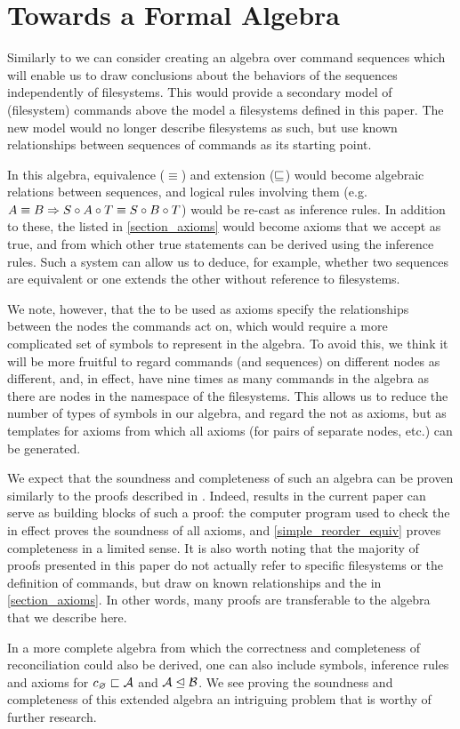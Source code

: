 
\section{Towards a Formal Algebra}

Similarly to \cite{NREC} we can consider creating an algebra over command sequences
which will enable us to draw conclusions about the behaviors of the sequences
independently of filesystems.
This would provide a secondary model of (filesystem) commands above the model a filesystems
defined in this paper. The new model would no longer describe filesystems as such,
but use known relationships between sequences of commands as its starting point.

In this algebra, equivalence ($\equiv$) and extension ($\sqsubseteq$) would become algebraic relations
between sequences, and logical rules involving them
(e.g. $ A\equiv B \Rightarrow S\circ A\circ T\equiv S\circ B\circ T $) would be re-cast as inference rules.
In addition to these, the  listed in \cref{section_axioms}
would become axioms that we accept as true, and from which other true statements can be derived
using the inference rules.
Such a system can allow us to deduce, for example, whether two sequences are equivalent
or one extends the other
without reference to filesystems.

We note, however, that the  to be used as axioms 
specify the relationships between the nodes
the commands act on, which would require a more complicated set of symbols to represent
in the algebra.
To avoid this, we think it will be more fruitful to regard commands (and sequences)
on different nodes as different, and, in effect, have nine times as many commands 
in the algebra as there are nodes in the namespace of the filesystems.
This allows us to reduce the number of types of symbols in our algebra, and regard
the  not as axioms, but as templates for axioms
from which all axioms (for pairs of separate nodes, etc.) can be generated.

We expect that the soundness and completeness of such an algebra can be proven
similarly to the proofs described in \cite{NREC}.
Indeed, results in the current paper can serve as building blocks of such a proof:
the computer program used to check the 
in effect proves the soundness of all axioms,
and \cref{simple_reorder_equiv} proves completeness in a limited sense.
It is also worth noting that the majority of proofs presented in this paper
do not actually refer to specific filesystems or the definition of commands,
but draw on known relationships and the
 in \cref{section_axioms}.
In other words, many proofs are transferable to the algebra that we describe here.

In a more complete algebra from which the correctness and completeness
of reconciliation could also be derived,
one can also include symbols, inference rules and axioms for 
$c_\varnothing\sqsubset{\mathcal{A}}$ and ${\mathcal{A}}\trianglelefteq{\mathcal{B}}$.
We see proving the soundness and completeness of this extended algebra
an intriguing problem that is worthy of further research.
